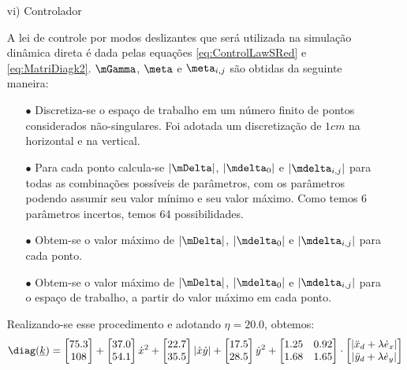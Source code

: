 \documentclass[]{politex}
\begin{document}
\begin{itemize}
\item[vi)] Controlador

A lei de controle por modos deslizantes que será utilizada na simulação dinâmica direta é dada pelas equações \eqref{eq:ControlLawSRed} e \eqref{eq:MatriDiagk2}. $\mGamma$, $\meta$ e $\meta_{i,j}$ são obtidas da seguinte maneira:
\begin{itemize}
\item[$\bullet$] Discretiza-se o espaço de trabalho em um número finito de pontos considerados não-singulares. Foi adotada um discretização de $1 cm$ na horizontal e na vertical.
\item[$\bullet$] Para cada ponto calcula-se $|\mDelta|$, $|\mdelta_0|$ e $|\mdelta_{i,j}|$ para todas as combinações possíveis de parâmetros, com os parâmetros podendo assumir seu valor mínimo e seu valor máximo. Como temos 6 parâmetros incertos, temos 64 possibilidades.
\item[$\bullet$] Obtem-se o valor máximo de $|\mDelta|$, $|\mdelta_0|$ e $|\mdelta_{i,j}|$ para cada ponto.
\item[$\bullet$] Obtem-se o valor máximo de $|\mDelta|$, $|\mdelta_0|$ e $|\mdelta_{i,j}|$ para o espaço de trabalho, a partir do valor máximo em cada ponto.
\end{itemize}

Realizando-se esse procedimento e adotando $\eta = 20.0$, obtemos:
\begin{equation}
\diag(\underline{k}) =
\begin{bmatrix}
75.3 \\
108
\end{bmatrix}
+
\begin{bmatrix}
37.0 \\
54.1
\end{bmatrix} \dot{x}^2
+
\begin{bmatrix}
22.7 \\
35.5
\end{bmatrix} |\dot{x} \dot{y} |
+
\begin{bmatrix}
17.5 \\
28.5
\end{bmatrix} \dot{y}^2
+
\begin{bmatrix}
1.25 & 0.92 \\
1.68 & 1.65
\end{bmatrix}
\cdot
\begin{bmatrix}
|\ddot{x}_d + \lambda \dot{e}_x| \\
|\ddot{y}_d + \lambda \dot{e}_y|
\end{bmatrix}
\end{equation}


\end{itemize}
\end{document}

